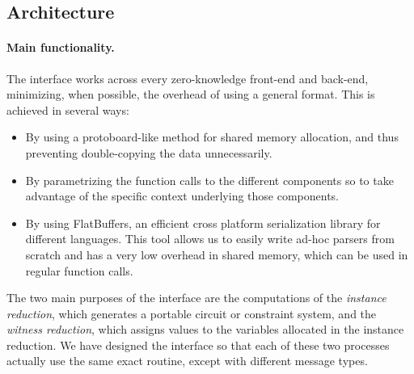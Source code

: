 \subsection{Architecture}

		
		
\paragraph{Main functionality.}

The interface works across every zero-knowledge front-end and back-end, minimizing, when possible, the overhead of using a general format. This is achieved in several ways:

\begin{itemize}
	\item By using a protoboard-like method for shared memory allocation, and thus preventing double-copying the data unnecessarily.
	\item By parametrizing the function calls to the different components so to take advantage of the specific context underlying those components.
	\item By using FlatBuffers, an efficient cross platform serialization library for different languages. This tool allows us to easily write ad-hoc parsers from scratch and has a very low overhead in shared memory, which can be used in regular function calls. 
\end{itemize}


The two main purposes of the interface are the computations of the \emph{instance reduction}, which generates a portable circuit or constraint system, and the \emph{witness reduction}, which assigns values to the variables allocated in the instance reduction. We have designed the interface so that each of these two processes actually use the same exact routine, except with different message types.

